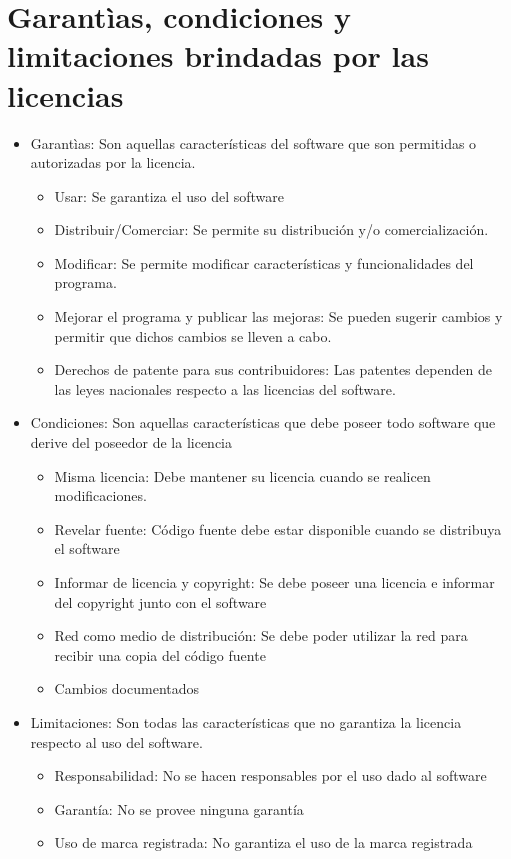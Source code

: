 \documentclass{article}
\begin{document}
\section{Garantìas, condiciones y limitaciones brindadas por las licencias}
\begin{itemize}
\item Garantìas: Son aquellas características del software que son permitidas o autorizadas por la licencia.
\begin{itemize}
\item Usar: Se garantiza el uso del software
\item Distribuir/Comerciar: Se permite su distribución y/o comercialización.
\item Modificar: Se permite modificar características y funcionalidades del programa.
\item Mejorar el programa y publicar las mejoras: Se pueden sugerir cambios y permitir que dichos cambios se lleven a cabo.
\item Derechos de patente para sus contribuidores: Las patentes dependen de las leyes nacionales respecto a las licencias del software.
\end{itemize}
\item Condiciones: Son aquellas características que debe poseer todo software que derive del poseedor de la licencia
\begin{itemize}
\item Misma licencia: Debe mantener su licencia cuando se realicen modificaciones.
\item Revelar fuente: Código fuente debe estar disponible cuando se distribuya el software
\item Informar de licencia y copyright: Se debe poseer una licencia e informar del copyright junto con el software
\item Red como medio de distribución: Se debe poder utilizar la red para recibir una copia del código fuente
\item Cambios documentados
\end{itemize}
\item Limitaciones: Son todas las características que no garantiza la licencia respecto al uso del software.
\begin{itemize}
\item Responsabilidad: No se hacen responsables por el uso dado al software
\item Garantía: No se provee ninguna garantía
\item Uso de marca registrada: No garantiza el uso de la marca registrada
\end{itemize}
\end{itemize}
\end{document}
